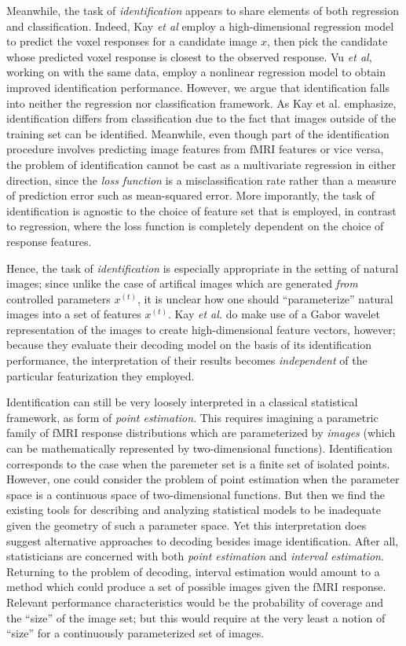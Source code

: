 \documentclass[11pt]{article}
\begin{document}
Meanwhile, the task of \emph{identification} appears to share elements
of both regression and classification.  Indeed, Kay \emph{et al}
employ a high-dimensional regression model to predict the voxel
responses for a candidate image $x$, then pick the candidate whose
predicted voxel response is closest to the observed response.  Vu
\emph{et al}, working on with the same data, employ a nonlinear
regression model to obtain improved identification performance.
However, we argue that identification falls into neither the
regression nor classification framework.  As Kay et al. emphasize,
identification differs from classification due to the fact that images
outside of the training set can be identified.  Meanwhile, even though
part of the identification procedure involves predicting image
features from fMRI features or vice versa, the problem of
identification cannot be cast as a multivariate regression in either
direction, since the \emph{loss function} is a misclassification rate
rather than a measure of prediction error such as mean-squared error.
More imporantly, the task of identification is agnostic to the choice
of feature set that is employed, in contrast to regression, where the
loss function is completely dependent on the choice of response
features.

Hence, the task of \emph{identification} is especially appropriate in
the setting of natural images; since unlike the case of artifical
images which are generated \emph{from} controlled parameters
$x^{(t)}$, it is unclear how one should ``parameterize'' natural
images into a set of features $x^{(t)}$.  Kay \emph{et al.} do make
use of a Gabor wavelet representation of the images to create
high-dimensional feature vectors, however; because they evaluate their
decoding model on the basis of its identification performance, the
interpretation of their results becomes \emph{independent} of the
particular featurization they employed.

Identification can still be very loosely interpreted in a classical
statistical framework, as form of \emph{point estimation}.  This
requires imagining a parametric family of fMRI response distributions
which are parameterized by \emph{images} (which can be mathematically
represented by two-dimensional functions).  Identification corresponds
to the case when the paremeter set is a finite set of isolated points.
However, one could consider the problem of point estimation when the
parameter space is a continuous space of two-dimensional functions.
But then we find the existing tools for describing and analyzing
statistical models to be inadequate given the geometry of such a
parameter space.  Yet this interpretation does suggest alternative
approaches to decoding besides image identification.  After all,
statisticians are concerned with both \emph{point estimation} and
\emph{interval estimation}.  Returning to the problem of decoding,
interval estimation would amount to a method which could produce a set
of possible images given the fMRI response.  Relevant performance
characteristics would be the probability of coverage and the ``size''
of the image set; but this would require at the very least a notion of
``size'' for a continuously parameterized set of images.
\end{document}
